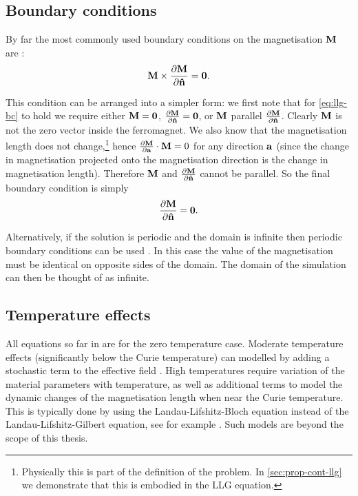 \subsection{Boundary conditions}
\label{sec:magn-bound-cond}

By far the most commonly used boundary conditions on the magnetisation $\boldsymbol{\mathrm{M}}$ are \cite[178, 181]{Aharoni1996} \cite{Rado1959}:
\begin{equation}
  \label{eq:llg-bc}
  \boldsymbol{\mathrm{M}} \times \frac{\partial \boldsymbol{\mathrm{M}}}{\partial \boldsymbol{\mathrm{\hat{n}}}} = \mathbf{0}.
\end{equation}

This condition can be arranged into a simpler form: we first note that for \cref{eq:llg-bc} to hold we require either $\boldsymbol{\mathrm{M}} = \mathbf{0}$, $\frac{\partial \boldsymbol{\mathrm{M}}}{\partial \boldsymbol{\mathrm{\hat{n}}}} = \mathbf{0}$, or $\boldsymbol{\mathrm{M}}$ parallel $\frac{\partial \boldsymbol{\mathrm{M}}}{\partial \boldsymbol{\mathrm{\hat{n}}}}$.
Clearly $\boldsymbol{\mathrm{M}}$ is not the zero vector inside the ferromagnet.
We also know that the magnetisation length does not change,\footnote{Physically this is part of the definition of the problem. In \cref{sec:prop-cont-llg} we demonstrate that this is embodied in the LLG equation.}
hence $\frac{\partial \boldsymbol{\mathrm{M}}}{\partial {\boldsymbol{\mathrm{a}}}} \cdot \boldsymbol{\mathrm{M}} = 0$ for any direction ${\boldsymbol{\mathrm{a}}}$ (since the change in magnetisation projected onto the magnetisation direction is the change in magnetisation length).
Therefore $\boldsymbol{\mathrm{M}}$ and $\frac{\partial \boldsymbol{\mathrm{M}}}{\partial \boldsymbol{\mathrm{\hat{n}}}}$ cannot be parallel.
So the final boundary condition is simply
\begin{equation}
  \label{eq:94}
  \frac{\partial \boldsymbol{\mathrm{M}}}{\partial \boldsymbol{\mathrm{\hat{n}}}} = \mathbf{0}.
\end{equation}

Alternatively, if the solution is periodic and the domain is infinite then periodic boundary conditions can be used \cite{Jeong2010}.
In this case the value of the magnetisation must be identical on opposite sides of the domain.
The domain of the simulation can then be thought of as infinite.

\subsection{Temperature effects}
\label{sec:temperature-effects}

All equations so far in  are for the zero temperature case.
Moderate temperature effects (significantly below the Curie temperature) can modelled by adding a stochastic term to the effective field \cite{DAquino2006}.
High temperatures require variation of the material parameters with temperature, as well as additional terms to model the dynamic changes of the magnetisation length when near the Curie temperature.
This is typically done by using the Landau-Lifshitz-Bloch equation instead of the Landau-Lifshitz-Gilbert equation, see for example \cite{Evans2012}.
Such models are beyond the scope of this thesis.


